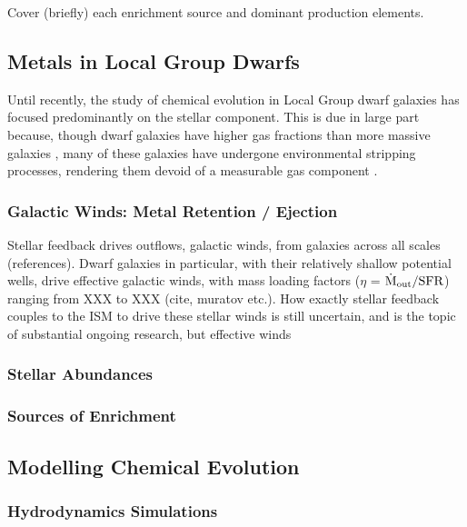 Cover (briefly) each enrichment source and dominant production elements. 


\subsection{Metals in Local Group Dwarfs}

Until recently, the study of chemical evolution in Local Group dwarf galaxies has focused predominantly on the stellar component. This is due in large part because, though dwarf galaxies have higher gas fractions than more massive galaxies \citep{Geha2006}, many of these galaxies have undergone environmental stripping processes, rendering them devoid of a measurable gas component \citep{GrcevichPutman2009}. 


\subsubsection{Galactic Winds: Metal Retention / Ejection}

Stellar feedback drives outflows, galactic winds, from galaxies across all scales (references). Dwarf galaxies in particular, with their relatively shallow potential wells, drive effective galactic winds, with mass loading factors ($\eta$ = $\dot{\rm{M}}_{\rm out} / {\rm SFR}$) ranging from XXX to XXX (cite, muratov etc.). How exactly stellar feedback couples to the ISM to drive these stellar winds is still uncertain, and is the topic of substantial ongoing research, but effective winds 

\subsubsection{Stellar Abundances}

\subsubsection{Sources of Enrichment}

\subsection{Modelling Chemical Evolution}

\subsubsection{Hydrodynamics Simulations}

